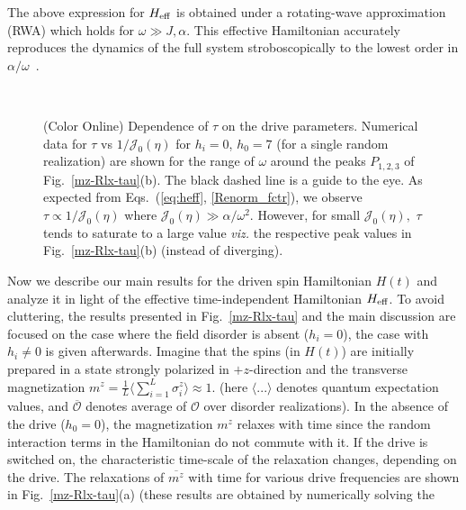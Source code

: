 \documentclass[reprint,preprintnumbers,showpacs,amsmath,twocolumn,showkeys,aps,prl]{revtex4-1}
\begin{document}
The above expression for $H_{\rm eff}$ is obtained under a rotating-wave approximation
(RWA) which holds for $\omega \gg J,\alpha.$ This effective Hamiltonian accurately reproduces the dynamics 
of the full system stroboscopically to the lowest order in $\alpha/\omega$~\cite{suppl}.
\begin{figure}[htb]
\ 
\caption{(Color Online) Dependence of $\tau$ on the drive parameters.
Numerical data for $\tau$ vs $1/{\mathcal J}_{0}(\eta)$ for $h_{i}=0$, $h_{0}=7$ 
(for a single random realization) are shown for the range of $\omega$ around the peaks $P_{1,2,3}$ 
of Fig.~\ref{mz-Rlx-tau}(b). The black dashed line is a guide to the eye. 
As expected from Eqs.~(\ref{eq:heff}, \ref{Renorm_fctr}),
we observe $\tau \propto 1/{\mathcal J}_{0}(\eta)$ where ${\mathcal J}_{0}(\eta) \gg  \alpha/\omega^{2}$.
However, for small ${\mathcal J}_{0}(\eta),$ $\tau$ tends to saturate to a large value \textit{viz.} the respective 
peak values in Fig.~\ref{mz-Rlx-tau}(b) (instead of diverging).}
\label{tau-vs-J0}
\end{figure}
Now we describe our main results for the driven spin Hamiltonian $H(t)$ 
and analyze it in light of the effective time-independent Hamiltonian $H_{\rm eff}$.
To avoid cluttering, the results presented in Fig.~\ref{mz-Rlx-tau} and the main discussion
are focused on the case where the field disorder is absent ($h_{i}=0$), the case with $h_{i}\ne 0$ is given afterwards.
Imagine that the spins (in $H(t)$) are initially prepared in a state strongly polarized in $+z$-direction 
and the transverse magnetization $ m^{z} = \frac{1}{L}\langle\sum_{i=1}^{L}\sigma_{i}^{z}\rangle \approx 1$. 
(here $\langle ... \rangle$ denotes quantum expectation values, 
and $\overline{{\mathcal O}}$ denotes average of ${\mathcal O}$ over disorder realizations).
In the absence of the drive ($h_{0}=0$), the magnetization $m^z$ relaxes with time since the random interaction terms in the Hamiltonian do not commute with it. If the drive is switched on, the characteristic time-scale of the relaxation 
changes, depending on the drive. The relaxations of $\overline{m^{z}}$ with time for various drive 
frequencies are shown in Fig.~\ref{mz-Rlx-tau}(a) (these results are obtained by numerically solving the 
\end{document}
